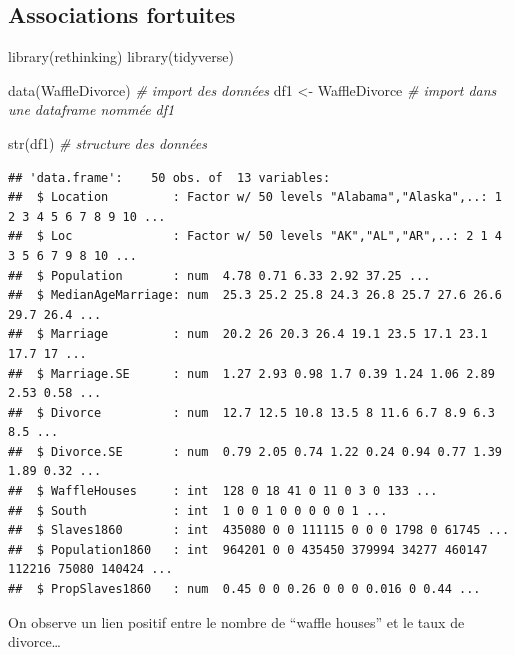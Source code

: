 \documentclass[
  a4paper,11pt,twoside,onecolumn,openright,final,oldfontcommands]{memoir}
\newenvironment{Shaded}{\begin{snugshade}}{\end{snugshade}}
\newcommand{\CommentTok}[1]{\textcolor[rgb]{0.56,0.35,0.01}{\textit{#1}}}
\newcommand{\FunctionTok}[1]{\textcolor[rgb]{0.00,0.00,0.00}{#1}}
\newcommand{\NormalTok}[1]{#1}
\newcommand{\OtherTok}[1]{\textcolor[rgb]{0.56,0.35,0.01}{#1}}
\theoremstyle{definition}
\theoremstyle{definition}
\theoremstyle{definition}
\theoremstyle{remark}
\begin{document}
\hypertarget{associations-fortuites}{%
\subsection{Associations fortuites}\label{associations-fortuites}}

\begin{Shaded}
\begin{Highlighting}[]
\FunctionTok{library}\NormalTok{(rethinking)}
\FunctionTok{library}\NormalTok{(tidyverse)}

\FunctionTok{data}\NormalTok{(WaffleDivorce) }\CommentTok{\# import des données}
\NormalTok{df1 }\OtherTok{\textless{}{-}}\NormalTok{ WaffleDivorce }\CommentTok{\# import dans une dataframe nommée df1}

\FunctionTok{str}\NormalTok{(df1) }\CommentTok{\# structure des données}
\end{Highlighting}
\end{Shaded}

\begin{verbatim}
## 'data.frame':    50 obs. of  13 variables:
##  $ Location         : Factor w/ 50 levels "Alabama","Alaska",..: 1 2 3 4 5 6 7 8 9 10 ...
##  $ Loc              : Factor w/ 50 levels "AK","AL","AR",..: 2 1 4 3 5 6 7 9 8 10 ...
##  $ Population       : num  4.78 0.71 6.33 2.92 37.25 ...
##  $ MedianAgeMarriage: num  25.3 25.2 25.8 24.3 26.8 25.7 27.6 26.6 29.7 26.4 ...
##  $ Marriage         : num  20.2 26 20.3 26.4 19.1 23.5 17.1 23.1 17.7 17 ...
##  $ Marriage.SE      : num  1.27 2.93 0.98 1.7 0.39 1.24 1.06 2.89 2.53 0.58 ...
##  $ Divorce          : num  12.7 12.5 10.8 13.5 8 11.6 6.7 8.9 6.3 8.5 ...
##  $ Divorce.SE       : num  0.79 2.05 0.74 1.22 0.24 0.94 0.77 1.39 1.89 0.32 ...
##  $ WaffleHouses     : int  128 0 18 41 0 11 0 3 0 133 ...
##  $ South            : int  1 0 0 1 0 0 0 0 0 1 ...
##  $ Slaves1860       : int  435080 0 0 111115 0 0 0 1798 0 61745 ...
##  $ Population1860   : int  964201 0 0 435450 379994 34277 460147 112216 75080 140424 ...
##  $ PropSlaves1860   : num  0.45 0 0 0.26 0 0 0 0.016 0 0.44 ...
\end{verbatim}

On observe un lien positif entre le nombre de ``waffle houses'' et le taux de divorce\ldots{}
\end{document}
